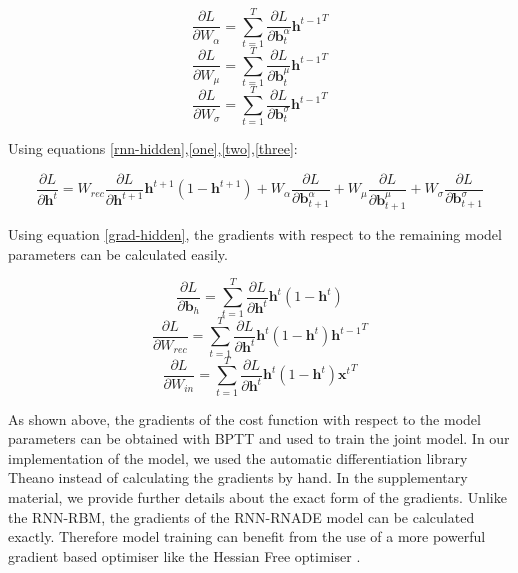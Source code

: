 \documentclass{article} %
\begin{document}
\begin{equation}
\frac{\partial L}{\partial W_{\alpha}} = \sum_{t=1}^T \frac{\partial L}{\partial \mathbf{b}^{\alpha}_{t}} {\mathbf{h}^{t-1}}^{T}
\end{equation}
\begin{equation}
\frac{\partial L}{\partial W_{\mu}} = \sum_{t=1}^T \frac{\partial L}{\partial \mathbf{b}^{\mu}_{t}} {\mathbf{h}^{t-1}}^{T}
\end{equation}
\begin{equation}
\frac{\partial L}{\partial W_{\sigma}} = \sum_{t=1}^T \frac{\partial L}{\partial \mathbf{b}^{\sigma}_{t}} {\mathbf{h}^{t-1}}^{T}
\end{equation}

Using equations \ref{rnn-hidden},\ref{one},\ref{two},\ref{three}:

\begin{equation}
\label{grad-hidden}
\frac{\partial L}{\partial \mathbf{h}^t} = W_{rec}\frac{\partial L}{\partial \mathbf{h}^{t+1}} \mathbf{h}^{t+1} (1 - \mathbf{h}^{t+1}) + W_{\alpha} \frac{\partial L}{\partial \mathbf{b}^{\alpha}_{t+1}} + W_{\mu} \frac{\partial L}{\partial \mathbf{b}^{\mu}_{t+1}} + W_{\sigma} \frac{\partial L}{\partial \mathbf{b}^{\sigma}_{t+1}}
\end{equation}

Using equation \ref{grad-hidden}, the gradients with respect to the remaining model parameters can be calculated easily. 

$$ \frac{\partial L}{\partial \mathbf{b}_{h}} =  \sum_{t=1}^{T} \frac{\partial L}{\partial \mathbf{h}^t} \mathbf{h}^t (1 - \mathbf{h}^t)$$
$$ \frac{\partial L}{\partial W_{rec}} = \sum_{t=1}^{T} \frac{\partial L}{\partial \mathbf{h}^t} \mathbf{h}^t (1 - \mathbf{h}^t) {\mathbf{h}^{t-1}}^T$$
$$ \frac{\partial L}{\partial W_{in}} = \sum_{t=1}^{T} \frac{\partial L}{\partial \mathbf{h}^t} \mathbf{h}^t (1 - \mathbf{h}^t) {\mathbf{x}^{t}}^T$$

As shown above, the gradients of the cost function with respect to the model parameters can be obtained with BPTT and used to train the joint model. In our implementation of the model, we used the automatic differentiation library Theano \cite{bergstra+al:2010-scipy} instead of calculating the gradients by hand. In the supplementary material, we provide further details about the exact form of the gradients. Unlike the RNN-RBM, the gradients of the RNN-RNADE model can be calculated exactly. Therefore model training can benefit from the use of a more powerful gradient based optimiser like the Hessian Free optimiser \cite{Martens2011}.
\end{document}
